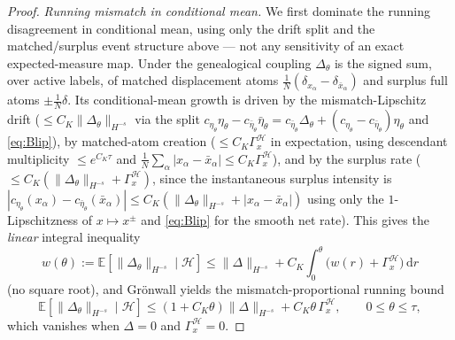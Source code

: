 \documentclass[a4paper,fleqn]{cas-sc}
\theoremstyle{definition}
\theoremstyle{remark}
\begin{document}
\begin{proof}
\emph{Running mismatch in conditional mean.} We first dominate the running
disagreement in conditional mean, using only the drift split and the matched/surplus
event structure above --- not any sensitivity of an exact expected-measure map. Under
the genealogical coupling $\Delta_\theta$ is the signed sum, over active labels, of
matched displacement atoms $\frac1N(\delta_{x_\alpha}-\delta_{\bar x_\alpha})$ and
surplus full atoms $\pm\frac1N\delta$. Its conditional-mean growth is driven by the
mismatch-Lipschitz drift ($\le C_K\|\Delta_\theta\|_{H^{-s}}$ via the split
$c_{\eta_\theta}\eta_\theta-c_{\bar\eta_\theta}\bar\eta_\theta
=c_{\bar\eta_\theta}\Delta_\theta+(c_{\eta_\theta}-c_{\bar\eta_\theta})\eta_\theta$ and
\eqref{eq:Blip}), by matched-atom creation ($\le C_K\Gamma_x^{\mathcal H}$ in
expectation, using descendant multiplicity $\le e^{C_K\tau}$ and
$\frac1N\sum_\alpha|x_\alpha-\bar x_\alpha|\le C_K\Gamma_x^{\mathcal H}$), and by the
surplus rate ($\le C_K(\|\Delta_\theta\|_{H^{-s}}+\Gamma_x^{\mathcal H})$, since the
instantaneous surplus intensity is
$|c_{\eta_\theta}(x_\alpha)-c_{\bar\eta_\theta}(\bar x_\alpha)|
\le C_K(\|\Delta_\theta\|_{H^{-s}}+|x_\alpha-\bar x_\alpha|)$ using only the
$1$-Lipschitzness of $x\mapsto x^\pm$ and \eqref{eq:Blip} for the smooth net rate).
This gives the \emph{linear} integral inequality
\[
w(\theta):=\mathbb E[\|\Delta_\theta\|_{H^{-s}}\mid\mathcal H]
\le\|\Delta\|_{H^{-s}}+C_K\!\int_0^\theta\bigl(w(r)+\Gamma_x^{\mathcal H}\bigr)\,\mathrm dr
\]
(no square root), and Gr\"onwall yields the mismatch-proportional running bound
\begin{equation}\label{eq:run-mismatch}
\mathbb E[\|\Delta_\theta\|_{H^{-s}}\mid\mathcal H]\le(1+C_K\theta)\|\Delta\|_{H^{-s}}+C_K\theta\,\Gamma_x^{\mathcal H},
\qquad 0\le\theta\le\tau,
\end{equation}
which vanishes when $\Delta=0$ and $\Gamma_x^{\mathcal H}=0$.


\end{proof}
\end{document}
